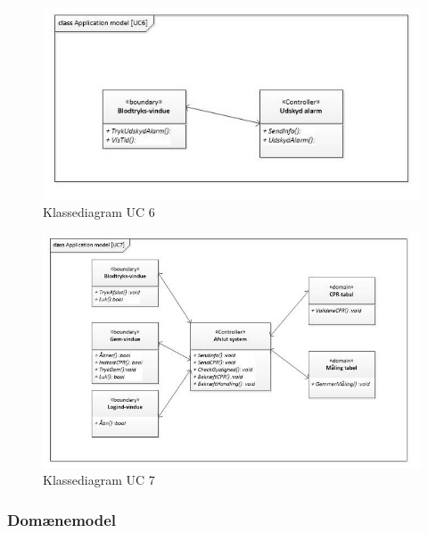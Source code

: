 \begin{figure}[H]
	\includegraphics[width=1\textwidth]{Figurer/classAppModelUC6}
	\caption{Klassediagram UC 6}
\end{figure}

\begin{figure}[H]
	\includegraphics[width=1\textwidth]{Figurer/classAppModelUC7}
	\caption{Klassediagram UC 7}
\end{figure}



\subsubsection{Domænemodel}

